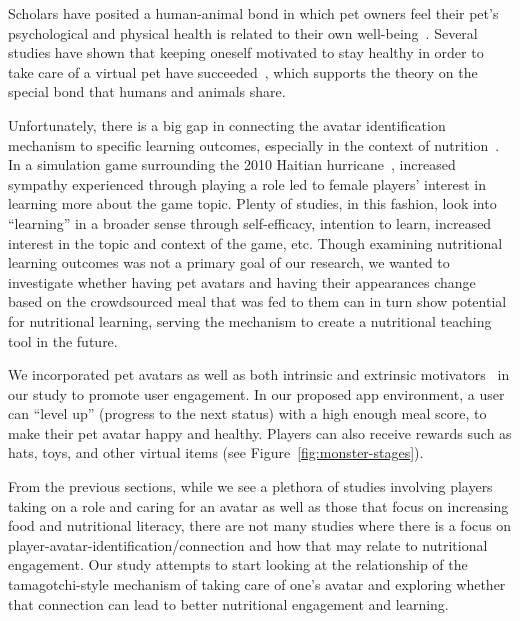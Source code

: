 Scholars have posited a human-animal bond in which pet owners feel their pet's psychological and physical health is related to their own well-being~\cite{chesney2007illusion,cohen2001defining,hosey2014human,lin2017exploring,zichermann2011gamification}. Several studies have shown that keeping oneself motivated to stay healthy in order to take care of a virtual pet have succeeded~\cite{ahn2015using,byrne2012caring,lin2006fish,pollak2010s}, which supports the theory on the special bond that humans and animals share. 

Unfortunately, there is a big gap in connecting the avatar identification mechanism to specific learning outcomes, especially in the context of nutrition~\cite{chang2019stereotype,chen2019effects,de2019algebright,lin2019evaluating}. In a simulation game surrounding the 2010 Haitian hurricane~\cite{bachen2016presence}, increased sympathy experienced through playing a role led to female players' interest in learning more about the game topic. Plenty of studies, in this fashion, look into ``learning'' in a broader sense through self-efficacy, intention to learn, increased interest in the topic and context of the game, etc. Though examining nutritional learning outcomes was not a primary goal of our research, we wanted to investigate whether having pet avatars and having their appearances change based on the crowdsourced meal that was fed to them can in turn show potential for nutritional learning, serving the mechanism to create a nutritional teaching tool in the future. 

We incorporated pet avatars as well as both intrinsic and extrinsic motivators~\cite{chen2016scaffolding,habgood2011motivating} in our study to promote user engagement. In our proposed app environment, a user can ``level up'' (progress to the next status) with a high enough meal score, to make their pet avatar happy and healthy. Players can also receive rewards such as hats, toys, and other virtual items (see Figure~\ref{fig:monster-stages}).

From the previous sections, while we see a plethora of studies involving players taking on a role and caring for an avatar as well as those that focus on increasing food and nutritional literacy, there are not many studies where there is a focus on player-avatar-identification/connection and how that may relate to nutritional engagement. Our study attempts to start looking at the relationship of the tamagotchi-style mechanism of taking care of one's avatar and exploring whether that connection can lead to better nutritional engagement and learning. 






